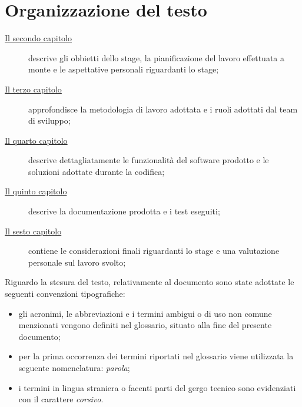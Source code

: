 \section{Organizzazione del testo}

\begin{description}
    \item[{\hyperref[cap:obbiettivi-pianificazione]{Il secondo capitolo}}] descrive gli obbietti dello stage, la pianificazione del lavoro effettuata a monte e le aspettative personali riguardanti lo stage;
    
    \item[{\hyperref[cap:metodologia-lavoro]{Il terzo capitolo}}] approfondisce la metodologia di lavoro adottata e i ruoli adottati dal team di sviluppo;
    
    \item[{\hyperref[cap:prodotto-sw]{Il quarto capitolo}}] descrive dettagliatamente le funzionalità del software prodotto e le soluzioni adottate durante la codifica;
    
    \item[{\hyperref[cap:docs-test]{Il quinto capitolo}}] descrive la documentazione prodotta e i test eseguiti;
    
    \item[{\hyperref[cap:considerazioni]{Il sesto capitolo}}] contiene le considerazioni finali riguardanti lo stage e una valutazione personale sul lavoro svolto;

\end{description}

Riguardo la stesura del testo, relativamente al documento sono state adottate le seguenti convenzioni tipografiche:
\begin{itemize}
	\item gli acronimi, le abbreviazioni e i termini ambigui o di uso non comune menzionati vengono definiti nel glossario, situato alla fine del presente documento;
	\item per la prima occorrenza dei termini riportati nel glossario viene utilizzata la seguente nomenclatura: \emph{parola}\glsfirstoccur;
	\item i termini in lingua straniera o facenti parti del gergo tecnico sono evidenziati con il carattere \emph{corsivo}.
\end{itemize}